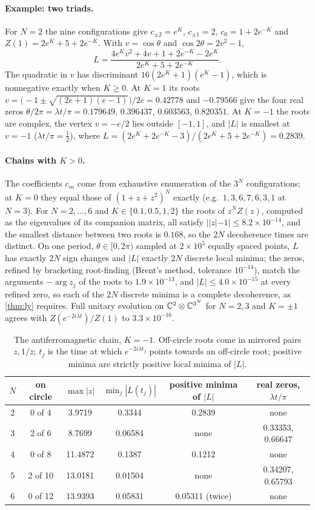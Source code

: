 \documentclass[11pt]{article}
\theoremstyle{definition}\newtheorem{definition}[theorem]{Definition}
\theoremstyle{remark}\newtheorem{remark}[theorem]{Remark}
\begin{document}
\paragraph{Example: two triads.} For $N=2$ the nine configurations give $c_{\pm2}=e^K$, $c_{\pm1}=2$, $c_0=1+2e^{-K}$ and $Z(1)=2e^K+5+2e^{-K}$. With $v=\cos\theta$ and $\cos2\theta=2v^2-1$,
\[
L=\frac{4e^Kv^2+4v+1+2e^{-K}-2e^K}{2e^K+5+2e^{-K}} .
\]
The quadratic in $v$ has discriminant $16(2e^K+1)(e^K-1)$, which is nonnegative exactly when $K\ge0$. At $K=1$ its roots $v=\bigl(-1\pm\sqrt{(2e+1)(e-1)}\bigr)/2e=0.42778$ and $-0.79566$ give the four real zeros $\theta/2\pi=\lambda t/\pi=0.179649$, $0.396437$, $0.603563$, $0.820351$. At $K=-1$ the roots are complex, the vertex $v=-e/2$ lies outside $[-1,1]$, and $|L|$ is smallest at $v=-1$ ($\lambda t/\pi=\frac12$), where $L=(2e^K+2e^{-K}-3)/(2e^K+5+2e^{-K})=0.2839$.

\paragraph{Chains with $K>0$.} The coefficients $c_m$ come from exhaustive enumeration of the $3^N$ configurations; at $K=0$ they equal those of $(1+z+z^2)^N$ exactly (e.g.\ $1,3,6,7,6,3,1$ at $N=3$). For $N=2,\dots,6$ and $K\in\{0.1,0.5,1,2\}$ the roots of $z^NZ(z)$, computed as the eigenvalues of its companion matrix, all satisfy $||z|-1|\le8.2\times10^{-14}$, and the smallest distance between two roots is $0.168$, so the $2N$ decoherence times are distinct. On one period, $\theta\in[0,2\pi)$ sampled at $2\times10^5$ equally spaced points, $L$ has exactly $2N$ sign changes and $|L|$ exactly $2N$ discrete local minima; the zeros, refined by bracketing root-finding (Brent's method, tolerance $10^{-14}$), match the arguments $-\arg z_j$ of the roots to $1.9\times10^{-13}$, and $|L|\le4.0\times10^{-15}$ at every refined zero, so each of the $2N$ discrete minima is a complete decoherence, as \cref{thm:ly} requires. Full unitary evolution on $\mathbb C^2\otimes\mathbb C^{3^N}$ for $N=2,3$ and $K=\pm1$ agrees with $Z(e^{-2i\lambda t})/Z(1)$ to $3.3\times10^{-16}$.

\begin{table}[t]\centering\small
\begin{tabular}{@{}cccccc@{}}\toprule
$N$ & on circle & $\max|z|$ & $\min_j|L(t_j)|$ & positive minima of $|L|$ & real zeros, $\lambda t/\pi$\\\midrule
2 & 0 of 4 & 3.9719 & 0.3344 & 0.2839 & none\\
3 & 2 of 6 & 8.7699 & 0.06584 & none & 0.33353, 0.66647\\
4 & 0 of 8 & 11.4872 & 0.1387 & 0.1212 & none\\
5 & 2 of 10 & 13.0181 & 0.01504 & none & 0.34207, 0.65793\\
6 & 0 of 12 & 13.9393 & 0.05831 & 0.05311 (twice) & none\\\bottomrule
\end{tabular}
\caption{The antiferromagnetic chain, $K=-1$. Off-circle roots come in mirrored pairs $z,1/\bar z$; $t_j$ is the time at which $e^{-2i\lambda t_j}$ points towards an off-circle root; positive minima are strictly positive local minima of $|L|$.}\label{tab:afm}
\end{table}
\end{document}
